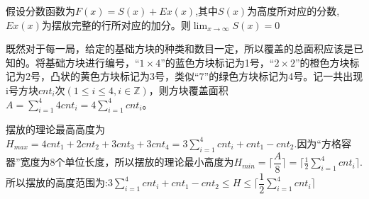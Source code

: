 \documentclass[lang=cn,a4paper]{elegantpaper}
\begin{document}
    假设分数函数为$F(x)=S(x)+Ex(x)$,其中$S(x)$为高度所对应的分数,$Ex(x)$为摆放完整的行所对应的加分。则$\displaystyle\lim_{x\rightarrow \infty}S(x)=0$

    既然对于每一局，给定的基础方块的种类和数目一定，所以覆盖的总面积应该是已知的。将基础方块进行编号，“$1\times4$”的蓝色方块标记为1号，“$2\times2$”的橙色方块标记为2号，凸状的黄色方块标记为3号，类似“7”的绿色方块标记为4号。记一共出现i号方块$cnt_i$次$(1\leqslant i\leqslant 4,i\in\mathbb{Z})$，则方块覆盖面积$\displaystyle A=\sum_{i=1}^4 4cnt_i=4\sum_{i=1}^4 cnt_i$。
    
    摆放的理论最高高度为$\displaystyle H_{max}=4cnt_1+2cnt_2+3cnt_3+3cnt_4=3\sum_{i=1}^4{cnt_i}+cnt_1-cnt_2. $因为“方格容器”宽度为8个单位长度，所以摆放的理论最小高度为$\displaystyle H_{min}=\lceil \dfrac{A}{8} \rceil=\lceil \frac{1}{2}\sum_{i=1}^4 cnt_i \rceil.$所以摆放的高度范围为:$\displaystyle 3\sum_{i=1}^4{cnt_i}+cnt_1-cnt_2 \leqslant H \leqslant \lceil \dfrac{1}{2} \sum_{i=1}^4 cnt_i\rceil $
\end{document}
